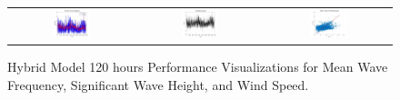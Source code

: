 \begin{figure}[ht!]
\begin{tabular}{ccc}
    \includegraphics[width=0.32\textwidth]{graphs/hybrid/120 hours/wind speed/actual vs forecast.jpg} &
    \includegraphics[width=0.32\textwidth]{graphs/hybrid/120 hours/wind speed/residuals.jpg} &
    \includegraphics[width=0.32\textwidth]{graphs/hybrid/120 hours/wind speed/scatter plot.jpg} \\
  \end{tabular}
  \caption{Hybrid Model 120 hours Performance Visualizations for Mean Wave Frequency, Significant Wave Height, and Wind Speed.}
  \label{fig:hybrid_120_hours}
\end{figure}

